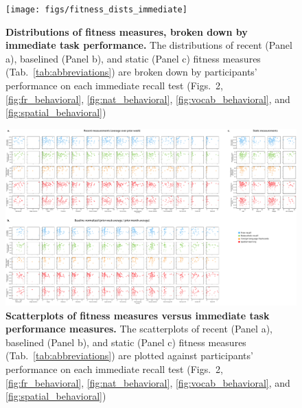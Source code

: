 \documentclass[10pt]{article}
\newcommand{\immediateBehavior}{2}
\begin{document}
\begin{figure}
\centering
\texttt{[image: figs/fitness\_dists\_immediate]}
\caption{\textbf{Distributions of fitness measures, broken down
    by immediate task performance.}  The distributions of recent
  (Panel a), baselined (Panel b), and static (Panel c) fitness
  measures (Tab.~\ref{tab:abbreviations}) are broken down by
  participants' performance on each immediate recall test
  (Figs.~\immediateBehavior, \ref{fig:fr_behavioral},
  \ref{fig:nat_behavioral}, \ref{fig:vocab_behavioral}, and \ref{fig:spatial_behavioral})}
\label{fig:fitness_dists_immediate}
\end{figure}

\begin{figure}
\centering
\includegraphics[width=\textwidth]{figs/fitness_scatter_immediate}
\caption{\textbf{Scatterplots of fitness measures versus
    immediate task performance measures.}  The scatterplots of recent
  (Panel a), baselined (Panel b), and static (Panel c) fitness
  measures (Tab.~\ref{tab:abbreviations}) are plotted against 
  participants' performance on each immediate recall test
  (Figs.~\immediateBehavior, \ref{fig:fr_behavioral}, \ref{fig:nat_behavioral}, \ref{fig:vocab_behavioral}, and \ref{fig:spatial_behavioral})}
\label{fig:fitness_scatters_immediate}
\end{figure}
\end{document}
